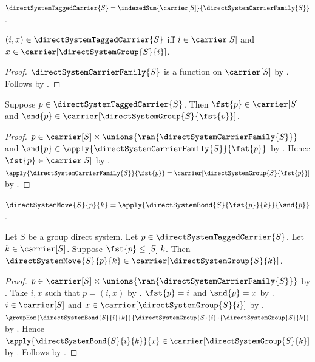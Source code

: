 \begin{definition}\label{direct_system_tagged_carrier}
    $\directSystemTaggedCarrier{S}=
        \indexedSum{\carrier[S]}{\directSystemCarrierFamily{S}}$.
\end{definition}

\begin{proposition}\label{direct_system_tagged_carrier_iff}
    $(i,x)\in\directSystemTaggedCarrier{S}$ iff
        $i\in\carrier[S]$ and
        $x\in\carrier[\directSystemGroup{S}{i}]$.
\end{proposition}
\begin{proof}
    $\directSystemCarrierFamily{S}$ is a function on $\carrier[S]$ by
        .
    Follows by .
\end{proof}

\begin{proposition}\label{direct_system_tagged_carrier_projections}
    Suppose $p\in\directSystemTaggedCarrier{S}$.
    Then $\fst{p}\in\carrier[S]$ and
        $\snd{p}\in\carrier[\directSystemGroup{S}{\fst{p}}]$.
\end{proposition}
\begin{proof}
    $p\in\carrier[S]\times\unions{\ran{\directSystemCarrierFamily{S}}}$
        and $\snd{p}\in
            \apply{\directSystemCarrierFamily{S}}{\fst{p}}$ by
        .
    Hence $\fst{p}\in\carrier[S]$ by .
    $\apply{\directSystemCarrierFamily{S}}{\fst{p}}
        =\carrier[\directSystemGroup{S}{\fst{p}}]$ by
        .
\end{proof}

\begin{definition}\label{direct_system_move}
    $\directSystemMove{S}{p}{k}=
        \apply{\directSystemBond{S}{\fst{p}}{k}}{\snd{p}}$.
\end{definition}

\begin{proposition}\label{direct_system_move_type}
    Let $S$ be a group direct system.
    Let $p\in\directSystemTaggedCarrier{S}$.
    Let $k\in\carrier[S]$.
    Suppose $\fst{p}\mathrel{\leq[S]}k$.
    Then $\directSystemMove{S}{p}{k}\in
        \carrier[\directSystemGroup{S}{k}]$.
\end{proposition}
\begin{proof}
    $p\in\carrier[S]\times\unions{\ran{\directSystemCarrierFamily{S}}}$ by
        .
    Take $i,x$ such that $p=(i,x)$ by .
    $\fst{p}=i$ and $\snd{p}=x$ by
        .
    $i\in\carrier[S]$ and
        $x\in\carrier[\directSystemGroup{S}{i}]$ by
        .
    $\groupHom
        {\directSystemBond{S}{i}{k}}
        {\directSystemGroup{S}{i}}
        {\directSystemGroup{S}{k}}$ by
        .
    Hence $\apply{\directSystemBond{S}{i}{k}}{x}\in
        \carrier[\directSystemGroup{S}{k}]$ by
        .
    Follows by .
\end{proof}

